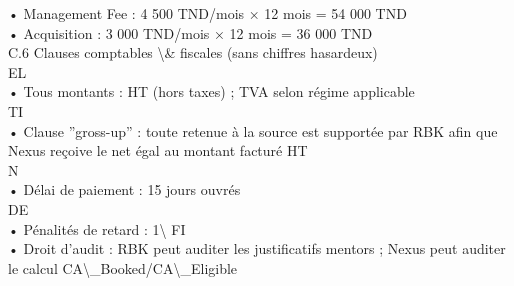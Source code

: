 \documentclass[12pt,landscape,a4paper]{article}
\begin{document}
• Management Fee : 4 500 TND/mois × 12 mois = 54 000 TND\\
\vspace{0.5em}
• Acquisition : 3 000 TND/mois × 12 mois = 36 000 TND\\
\vspace{0.5em}
\vspace{0.5em}
\vspace{0.5em}
C.6 Clauses comptables \textbackslash{}& fiscales (sans chiffres hasardeux)\\
\vspace{0.5em}
\vspace{0.5em}
\vspace{0.5em}
\vspace{0.5em}
EL\\
• Tous montants : HT (hors taxes) ; TVA selon régime applicable\\
\vspace{0.5em}
\vspace{0.5em}
\vspace{0.5em}
\vspace{0.5em}
TI\\
• Clause ”gross-up” : toute retenue à la source est supportée par RBK afin que Nexus reçoive le net égal au montant facturé HT\\
\vspace{0.5em}
\vspace{0.5em}
\vspace{0.5em}
\vspace{0.5em}
N\\
• Délai de paiement : 15 jours ouvrés\\
\vspace{0.5em}
\vspace{0.5em}
\vspace{0.5em}
\vspace{0.5em}
DE\\
• Pénalités de retard : 1\textbackslash{}%
\vspace{0.5em}
\vspace{0.5em}
\vspace{0.5em}
\vspace{0.5em}
FI\\
• Droit d’audit : RBK peut auditer les justificatifs mentors ; Nexus peut auditer le calcul CA\textbackslash{}_Booked/CA\textbackslash{}_Eligible\\
\vspace{0.5em}
\end{document}
